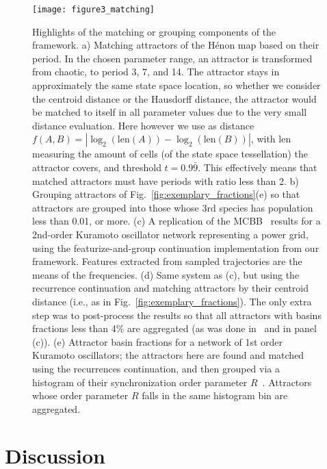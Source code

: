 \documentclass[%
 aip,
 amsmath,amssymb,
 reprint,%
]{revtex4-1}
\begin{document}
\begin{figure}
    \centering
    \texttt{[image: figure3\_matching]}
    \caption{Highlights of the matching or grouping components of the framework. a) Matching attractors of the H\'enon map based on their period. In the chosen parameter range, an attractor is transformed from chaotic, to period 3, 7, and 14. The attractor stays in approximately the same state space location, so whether we consider the centroid distance or the Hausdorff distance, the attractor would be matched to itself in all parameter values due to the very small distance evaluation. Here however we use as distance $f(A,B) = |\log_2(\mathrm{len}(A)) - \log_2(\mathrm{len}(B))|$, with $\mathrm{len}$ measuring the amount of cells (of the state space tessellation) the attractor covers, and threshold $t=0.9\bar{9}$. This effectively means that matched attractors must have periods with ratio less than 2. b) Grouping attractors of Fig.~\ref{fig:exemplary_fractions}(e) so that attractors are grouped into those whose 3rd species has population less than 0.01, or more. (c) A replication of the MCBB~\cite{Gelbrecht2020} results for a 2nd-order Kuramoto oscillator network representing a power grid, using the featurize-and-group continuation implementation from our framework. Features extracted from sampled trajectories are the means of the frequencies. (d) Same system as (c), but using the recurrence continuation and matching attractors by their centroid distance (i.e., as in Fig.~\ref{fig:exemplary_fractions}). The only extra step was to post-process the results so that all attractors with basins fractions less than 4\% are aggregated (as was done in~\cite{Gelbrecht2020} and in panel (c)). (e) Attractor basin fractions for a network of 1st order Kuramoto oscillators; the attractors here are found and matched using the recurrences continuation, and then grouped via a histogram of their synchronization order parameter $R$~\cite[Chap. 9]{DatserisBook}. Attractors whose order parameter $R$ falls in the same histogram bin are aggregated.
    }
    \label{fig:matching}
\end{figure}

\section{Discussion}
\label{sec:discussion}
\end{document}
